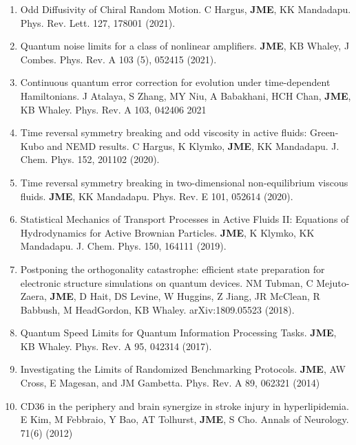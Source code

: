 \documentclass{article}
\begin{document}
\begin{refsection}
\begin{enumerate}
		\item  Odd Diffusivity of Chiral Random Motion. C Hargus, \textbf{JME}, KK Mandadapu. Phys. Rev. Lett. 127, 178001 (2021).
		\item  Quantum noise limits for a class of nonlinear amplifiers. \textbf{JME}, KB Whaley, J Combes. Phys. Rev. A 103 (5), 052415
		(2021).
		
			\item Continuous quantum error correction for evolution under time-dependent Hamiltonians. J Atalaya, S Zhang, MY Niu,
		A Babakhani, HCH Chan, \textbf{JME}, KB Whaley. Phys. Rev. A 103, 042406 2021
		
		\item  Time reversal symmetry breaking and odd viscosity in active fluids: Green-Kubo and NEMD results. C Hargus, K Klymko,
		\textbf{JME}, KK Mandadapu. J. Chem. Phys. 152, 201102 (2020).
		\item  Time reversal symmetry breaking in two-dimensional non-equilibrium viscous fluids. \textbf{JME}, KK Mandadapu.
		Phys. Rev. E 101, 052614 (2020).
		\item  Statistical Mechanics of Transport Processes in Active Fluids II: Equations of Hydrodynamics for Active Brownian Particles. \textbf{JME}, K Klymko, KK Mandadapu. J. Chem. Phys. 150, 164111 (2019).
		\item  Postponing the orthogonality catastrophe: efficient state preparation for electronic structure simulations on quantum
		devices. NM Tubman, C Mejuto-Zaera, \textbf{JME}, D Hait, DS Levine, W Huggins, Z Jiang, JR McClean, R Babbush, M HeadGordon, KB Whaley. arXiv:1809.05523 (2018).
		\item  Quantum Speed Limits for Quantum Information Processing Tasks. \textbf{JME}, KB Whaley. Phys. Rev. A 95, 042314 (2017).
		\item  Investigating the Limits of Randomized Benchmarking Protocols. \textbf{JME}, AW Cross, E Magesan, and JM Gambetta. Phys.
		Rev. A 89, 062321 (2014)
		\item  CD36 in the periphery and brain synergize in stroke injury in hyperlipidemia. E Kim, M Febbraio, Y Bao, AT Tolhurst,
		\textbf{JME}, S Cho. Annals of Neurology. 71(6) (2012)
	\end{enumerate}
	\end{refsection}
	

	
	\vfill
	
\end{document}
